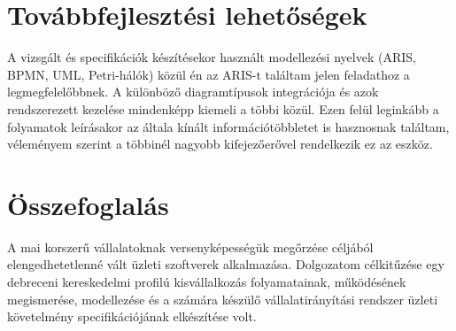 \documentclass[12pt]{article}
\begin{document}
\newpage
\section{Továbbfejlesztési lehetőségek}

A vizsgált és specifikációk készítésekor használt modellezési nyelvek (ARIS, BPMN, UML, Petri-hálók) közül én az ARIS-t találtam jelen feladathoz a legmegfelelőbbnek. A különböző diagramtípusok integrációja és azok rendszerezett kezelése mindenképp kiemeli a többi közül. Ezen felül leginkább a folyamatok leírásakor az általa kínált információtöbbletet is hasznosnak találtam, véleményem szerint a többinél nagyobb kifejezőerővel rendelkezik ez az eszköz. 

\newpage
\section*{Összefoglalás}

A mai korszerű vállalatoknak versenyképességük megőrzése céljából elengedhetetlenné vált üzleti szoftverek alkalmazása. Dolgozatom célkitűzése egy debreceni kereskedelmi profilú kisvállalkozás folyamatainak, működésének megismerése, modellezése és a számára készülő vállalatirányítási rendszer üzleti követelmény specifikációjának elkészítése volt. 




\end{document}
